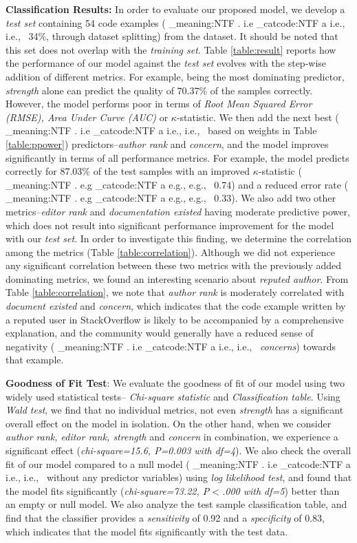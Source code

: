 \documentclass[conference]{IEEEtran}
\makeatletter
\newcommand\latinabbrev[1]{
  \peek_meaning:NTF . {%
    #1\@}%
  { \peek_catcode:NTF a {%
      #1., \@ }%
    {#1., \@}}}
\def\eg{\latinabbrev{e.g}}
\def\ie{\latinabbrev{i.e}}
\makeatother
\begin{document}
\textbf{Classification Results:} In order to evaluate our proposed model, we develop a \emph{test set} containing 54 code examples (\ie\ 34\%, through dataset splitting) from the dataset. It should be noted that this set does not overlap with the \emph{training set}. Table \ref{table:result} reports how the performance of our model against the \emph{test set} evolves with the step-wise addition of different metrics. For example, being the most dominating predictor, \emph{strength} alone can predict the quality of 70.37\% of the samples correctly. However, the model performs poor in terms of \emph{Root Mean Squared Error (RMSE), Area Under Curve (AUC)} or $\kappa$-statistic. We then add the next best (\ie\ based on weights in Table \ref{table:ppower}) predictors--\emph{author rank} and \emph{concern}, and the model improves significantly in terms of all performance metrics. For example, the model predicts correctly for 87.03\% of the test samples with an improved $\kappa$-statistic (\eg\ 0.74) and a reduced error rate (\eg\ 0.33). We also add two other metrics--\emph{editor rank} and \emph{documentation existed} having moderate predictive power, which does not result into significant performance improvement for the model with our \emph{test set}. In order to investigate this finding, we determine the correlation among the metrics (Table \ref{table:correlation}). Although we did not experience any significant correlation between these two metrics with the previously added dominating metrics, we found an interesting scenario about \emph{reputed author}. From Table \ref{table:correlation}, we note that \emph{author rank} is moderately correlated with \emph{document existed} and \emph{concern}, which indicates that the code example written by a reputed user in StackOverflow is likely to be accompanied by a comprehensive explanation, and the community would generally have a reduced sense of negativity (\ie\ \emph{concerns}) towards that example.

\textbf{Goodness of Fit Test}: We evaluate the goodness of fit of our model using two widely used statistical tests-- \emph{Chi-square statistic} \cite{kevic} and \emph{Classification table}. Using \emph{Wald test},  we find that no individual metrics, not even \emph{strength} has a significant overall effect on the model in isolation. On the other hand, when we consider \emph{author rank, editor rank, strength} and \emph{concern} in combination, we experience a significant effect (\emph{chi-square=15.6, P=0.003 with df=4}). We also check the overall fit of our model compared to a null model (\ie\ without any predictor variables) using \emph{log likelihood test}, and found that the model fits significantly (\emph{chi-square=73.22, P$<$.000 with df=5}) better than an empty or null model. We also analyze the test sample classification table, and find that the classifier provides a \emph{sensitivity} of 0.92 and a \emph{specificity} of 0.83, which indicates that the model fits significantly with the test data.    
\end{document}
